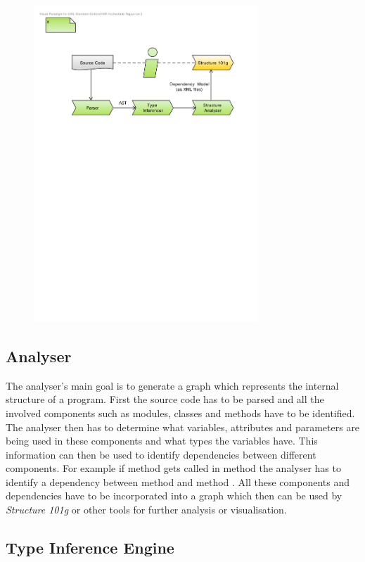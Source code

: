 \documentclass[12pt,halfparskip]{scrartcl}
\begin{document}
\begin{figure}[h] \centering
\includegraphics[width=0.75\textwidth]{big_picture}
\end{figure}


\subsection*{Analyser}

The analyser's main goal is to generate a graph which represents the internal structure of a program. First the source code has to be parsed and all the involved components such as modules, classes and methods have to be identified. The analyser then has to determine what variables, attributes and parameters are being used in these components and what types the variables have. This information can then be used to identify dependencies between different components. For example if method  gets called in method  the analyser has to identify a dependency between method  and method . All these components and dependencies have to be incorporated into a graph which then can be used by \emph{Structure 101g} or other tools for further analysis or visualisation. 

\subsection*{Type Inference Engine}
\end{document}
